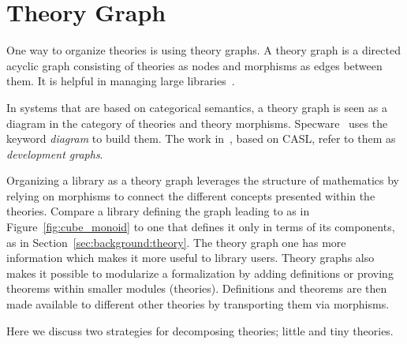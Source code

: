 
\section{Theory Graph}\label{sec:background:theorygraph}
One way to organize theories is using theory graphs. A theory graph is a directed acyclic graph consisting of theories as nodes and morphisms as edges between them. It is helpful in managing large libraries~\cite{kohlhase2010towards}.

In systems that are based on categorical semantics, a theory graph is seen as a diagram in the category of theories and theory morphisms. Specware~\cite{Smith99} uses the keyword \emph{diagram} to build them. The work in~\cite{developmentGraph2000}, based on CASL, refer to them as \emph{development graphs}. 

Organizing a library as a theory graph leverages the structure of mathematics by relying on morphisms to connect the different concepts presented within the theories. Compare a library defining the graph leading to   as in Figure~\ref{fig:cube_monoid} to one that defines it only in terms of its components, as in Section~\ref{sec:background:theory}. The theory graph one has more information which makes it more useful to library users. 
Theory graphs also makes it possible to modularize a formalization by adding definitions or proving theorems within smaller modules (theories). Definitions and theorems are then made available to different other theories by transporting them via morphisms. 

Here we discuss two strategies for decomposing theories; little and tiny theories.  

  
